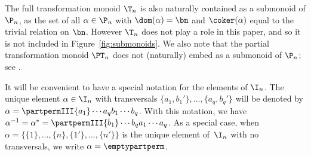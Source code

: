 The full transformation monoid $\T_n$ is also naturally contained as a submonoid of $\P_n$, as
the set of all $\alpha\in\P_n$ with $\dom(\alpha)=\bn$ and $\coker(\alpha)$ equal to the
trivial relation on $\bn$. However $\T_n$ does not play a role in
this paper, and so it is not included in Figure~\ref{fig:submonoids}.  We also note that the partial transformation monoid $\PT_n$ does not (naturally) embed as a submonoid of $\P_n$; see \cite[Section 3.2]{JEgrpm}.

It will be convenient to have a special notation for the elements of $\I_n$.  The unique element $\alpha\in\I_n$ with transversals $\{a_1,b_1'\},\ldots,\{a_q,b_q'\}$ will be denoted by $\alpha=\partpermIII{a_1}\cdots{a_q}{b_1}\cdots{b_q}$.  With this notation, we have $\alpha^{-1}=\alpha^*=\partpermIII{b_1}\cdots{b_q}{a_1}\cdots{a_q}$.  As a special case, when $\alpha=\big\{\{1\},\ldots,\{n\},\{1'\},\ldots,\{n'\}\big\}$ is the unique element of~$\I_n$ with no transversals, we write $\alpha=\emptypartperm$.



